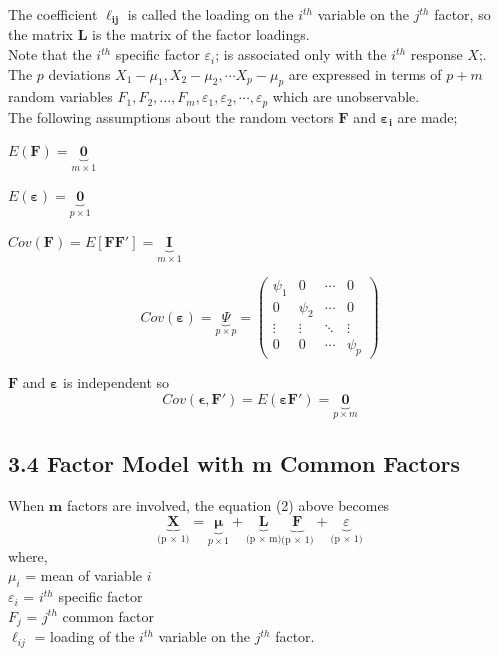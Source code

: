 \documentclass[12]{article}
\begin{document}
\noindent The coefficient $\mathbf{\ell_{ij}}$ is called the loading on the $i^{th}$ variable on the $j^{th}$ factor, so the matrix $\mathbf{L}$ is the matrix of the factor loadings. \\
Note that the $i^{th}$ specific factor $\varepsilon_i$; is associated only 
with the $i^{th}$ response $X$;. The $p$ deviations $X_1 - \mu_1,  X_2- \mu_2, \cdots X_p- \mu_p$  are expressed in terms of $p + m$ random variables $F_1 ,F_2, ... , F_m, \varepsilon_1, \varepsilon_2,\cdots , \varepsilon_p$ which are unobservable. \\
\noindent The following assumptions about the random vectors $\mathbf{F}$ and $\mathbf{\varepsilon_i}$ are made;

	\begin{bracketedromanenum}
	\item $E(\mathbf{F})= \underbrace{\mathbf{0}}_{m \times 1}$
	\item  $E(\mathbf{\varepsilon})= \underbrace{\mathbf{0}}_{p \times 1}$
	
	\item $Cov(\mathbf{F})= E[\mathbf{FF'}]=\underbrace{\textbf{I}}_{m \times 1}$
	\item 
\begin{equation*}
		Cov(\mathbf{\varepsilon})= \underbrace{\Psi}_{p \times p}  = \begin{pmatrix}
			\psi_{1} & 0 & \cdots & 0 \\
			0 & \psi_{2} & \cdots & 0 \\
			\vdots & \vdots & \ddots & \vdots \\
			0 & 0 & \cdots & \psi_{p}
		\end{pmatrix}
\end{equation*}
	\item $\mathbf{F}$ and $\mathbf{\varepsilon}$ is independent so $$Cov(\mathbf{\epsilon, F'})=E(\mathbf{\varepsilon F'}) = \underbrace{\mathbf{0}}_{p \times m}$$
	\end{bracketedromanenum}

\subsection* {3.4  Factor Model with m Common Factors}
When $\mathbf{m}$ factors are involved, the equation (2) above becomes
\begin{equation}
	\underbrace{\mathbf{X}}_\text{(p $\times$ 1)}=\underbrace{\mathbf{\mu}}_{p \times 1}
	+\underbrace{\mathbf{L}}_\text{(p $\times$ m)} \underbrace{\mathbf{F}}_\text{(p $\times$ 1)} + \underbrace{\varepsilon}_\text{(p $\times$ 1)}
\end{equation}
\noindent where,\\
$\mu_i$ = mean of variable $i$ \\
$\varepsilon_i$ = $i^{th}$ specific factor \\
$F_j$ = $j^{th}$ common factor\\
$\ell_{ij}$ = loading of the $i^{th}$ variable on the $j^{th}$ factor.\\
\end{document}
